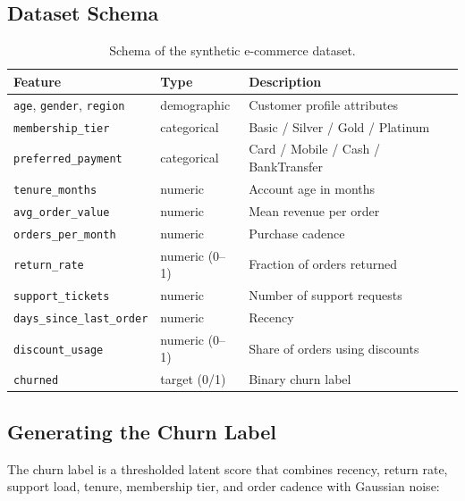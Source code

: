 \documentclass[11pt,a4paper]{article}
\begin{document}
\subsection{Dataset Schema}

\begin{table}[h]
\centering
\small
\begin{tabularx}{\textwidth}{@{}llX@{}}
\toprule
\textbf{Feature} & \textbf{Type} & \textbf{Description} \\
\midrule
\texttt{age}, \texttt{gender}, \texttt{region} & demographic   & Customer profile attributes \\
\texttt{membership\_tier}                      & categorical   & Basic / Silver / Gold / Platinum \\
\texttt{preferred\_payment}                    & categorical   & Card / Mobile / Cash / BankTransfer \\
\texttt{tenure\_months}                        & numeric       & Account age in months \\
\texttt{avg\_order\_value}                     & numeric       & Mean revenue per order \\
\texttt{orders\_per\_month}                    & numeric       & Purchase cadence \\
\texttt{return\_rate}                          & numeric (0--1)& Fraction of orders returned \\
\texttt{support\_tickets}                      & numeric       & Number of support requests \\
\texttt{days\_since\_last\_order}              & numeric       & Recency \\
\texttt{discount\_usage}                       & numeric (0--1)& Share of orders using discounts \\
\texttt{churned}                               & target (0/1)  & Binary churn label \\
\bottomrule
\end{tabularx}
\caption{Schema of the synthetic e-commerce dataset.}
\label{tab:schema}
\end{table}

\subsection{Generating the Churn Label}

The churn label is a thresholded latent score that combines recency,
return rate, support load, tenure, membership tier, and order cadence
with Gaussian noise:
\end{document}
